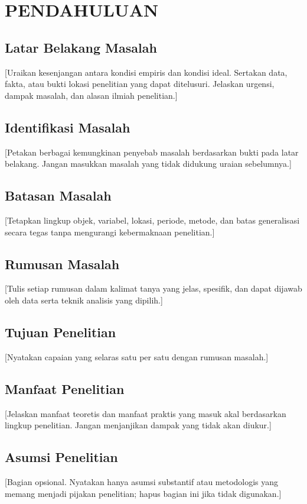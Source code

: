 \chapter{PENDAHULUAN}

\section{Latar Belakang Masalah}

[Uraikan kesenjangan antara kondisi empiris dan kondisi ideal. Sertakan data,
fakta, atau bukti lokasi penelitian yang dapat ditelusuri. Jelaskan urgensi,
dampak masalah, dan alasan ilmiah penelitian.]

\section{Identifikasi Masalah}

[Petakan berbagai kemungkinan penyebab masalah berdasarkan bukti pada latar
belakang. Jangan masukkan masalah yang tidak didukung uraian sebelumnya.]

\section{Batasan Masalah}

[Tetapkan lingkup objek, variabel, lokasi, periode, metode, dan batas generalisasi
secara tegas tanpa mengurangi kebermaknaan penelitian.]

\section{Rumusan Masalah}

[Tulis setiap rumusan dalam kalimat tanya yang jelas, spesifik, dan dapat dijawab
oleh data serta teknik analisis yang dipilih.]

\section{Tujuan Penelitian}

[Nyatakan capaian yang selaras satu per satu dengan rumusan masalah.]

\section{Manfaat Penelitian}

[Jelaskan manfaat teoretis dan manfaat praktis yang masuk akal berdasarkan
lingkup penelitian. Jangan menjanjikan dampak yang tidak akan diukur.]

\section{Asumsi Penelitian}

[Bagian opsional. Nyatakan hanya asumsi substantif atau metodologis yang memang
menjadi pijakan penelitian; hapus bagian ini jika tidak digunakan.]
